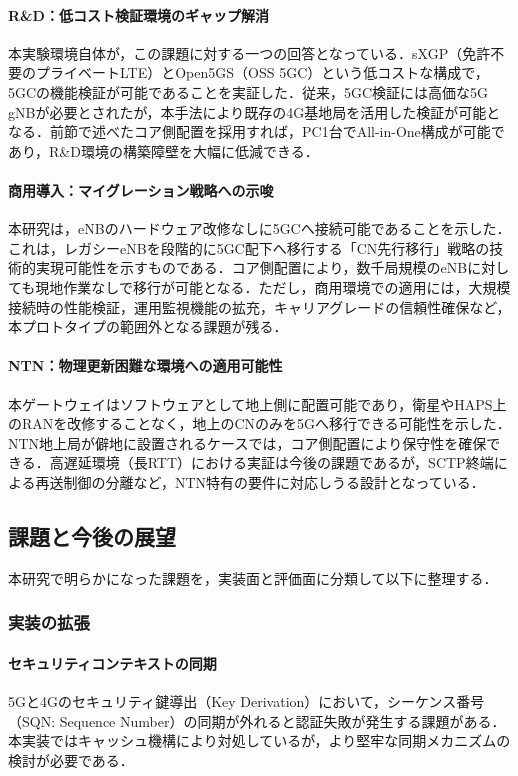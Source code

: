 \paragraph{R\&D：低コスト検証環境のギャップ解消}
本実験環境自体が，この課題に対する一つの回答となっている．sXGP（免許不要のプライベートLTE）とOpen5GS（OSS 5GC）という低コストな構成で，5GCの機能検証が可能であることを実証した．従来，5GC検証には高価な5G gNBが必要とされたが，本手法により既存の4G基地局を活用した検証が可能となる．前節で述べたコア側配置を採用すれば，PC1台でAll-in-One構成が可能であり，R\&D環境の構築障壁を大幅に低減できる．

\paragraph{商用導入：マイグレーション戦略への示唆}
本研究は，eNBのハードウェア改修なしに5GCへ接続可能であることを示した．これは，レガシーeNBを段階的に5GC配下へ移行する「CN先行移行」戦略の技術的実現可能性を示すものである．コア側配置により，数千局規模のeNBに対しても現地作業なしで移行が可能となる．ただし，商用環境での適用には，大規模接続時の性能検証，運用監視機能の拡充，キャリアグレードの信頼性確保など，本プロトタイプの範囲外となる課題が残る．

\paragraph{NTN：物理更新困難な環境への適用可能性}
本ゲートウェイはソフトウェアとして地上側に配置可能であり，衛星やHAPS上のRANを改修することなく，地上のCNのみを5Gへ移行できる可能性を示した．NTN地上局が僻地に設置されるケースでは，コア側配置により保守性を確保できる．高遅延環境（長RTT）における実証は今後の課題であるが，SCTP終端による再送制御の分離など，NTN特有の要件に対応しうる設計となっている．

\subsection{課題と今後の展望}
本研究で明らかになった課題を，実装面と評価面に分類して以下に整理する．

\subsubsection{実装の拡張}
\paragraph{セキュリティコンテキストの同期}
5Gと4Gのセキュリティ鍵導出（Key Derivation）において，シーケンス番号（SQN: Sequence Number）の同期が外れると認証失敗が発生する課題がある．本実装ではキャッシュ機構により対処しているが，より堅牢な同期メカニズムの検討が必要である．

